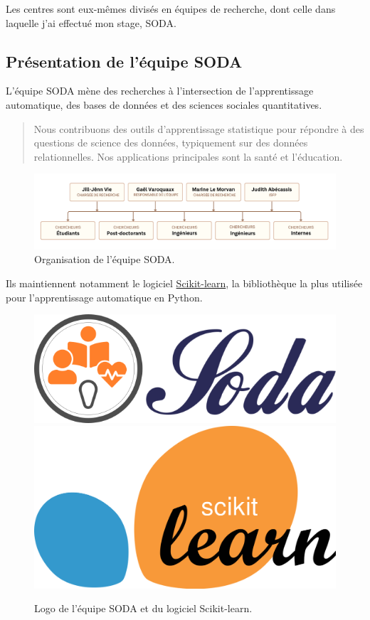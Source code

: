 \documentclass[12pt, letterpaper]{article}
\begin{document}
Les centres sont eux-mêmes divisés en équipes de recherche, dont celle dans laquelle j'ai effectué mon stage, SODA.

\subsection{Présentation de l'équipe SODA}

L'équipe SODA mène des recherches à l'intersection de l'apprentissage automatique, des bases de données et des sciences sociales quantitatives.

\begin{quotation}
    \og Nous contribuons des outils d'apprentissage statistique pour répondre à des questions de science des données, typiquement sur des données relationnelles. Nos applications principales sont la santé et l'éducation.\fg \cite{soda}
\end{quotation}

\begin{figure}[h]
    \centering
    \includegraphics[width=1\textwidth]{organigramme}
    \caption{Organisation de l'équipe SODA.}
\end{figure}

Ils maintiennent notamment le logiciel \href{https://https://scikit-learn.org/}{Scikit-learn}, la bibliothèque la plus utilisée pour l'apprentissage automatique en Python. 

\begin{figure}[h]
    \centering
    \includegraphics[height=0.1\textwidth]{soda}
    \hspace{1em}
    \includegraphics[height=0.1\textwidth]{scikit-learn}
    \caption{Logo de l'équipe SODA et du logiciel Scikit-learn.}
\end{figure}
\end{document}
